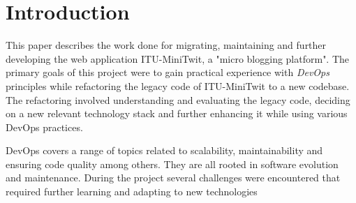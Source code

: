 \section{Introduction}
This paper describes the work done for migrating, maintaining and further developing the web application ITU-MiniTwit, a "micro blogging platform".
The primary goals of this project were to gain practical experience with \textit{DevOps} principles while refactoring the legacy code of ITU-MiniTwit to a new codebase. The refactoring involved understanding and evaluating the legacy code, deciding on a new relevant technology stack and further enhancing it while using various DevOps practices.

DevOps covers a range of topics related to scalability, maintainability and ensuring code quality among others. They are all rooted in software evolution and maintenance. During the project several challenges were encountered that required further learning and adapting to new technologies 
